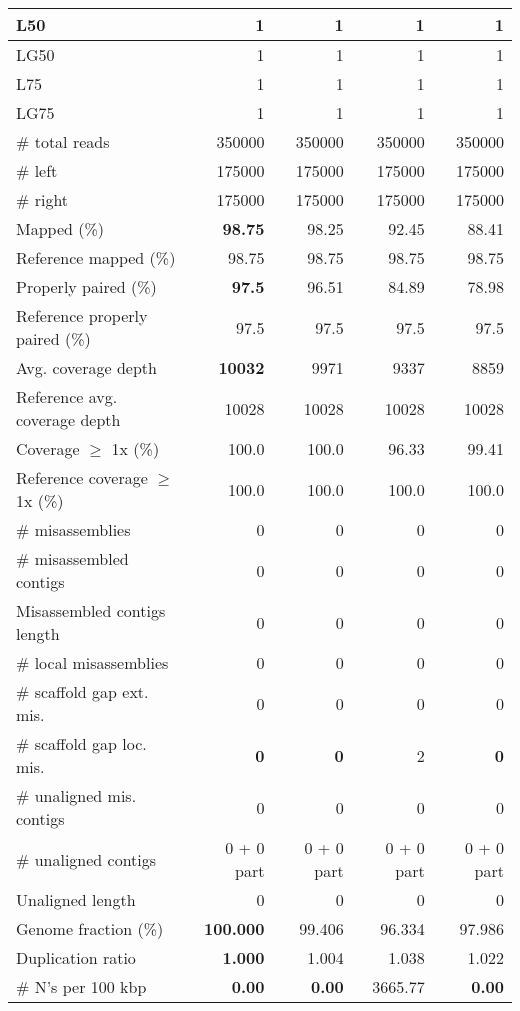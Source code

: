 \documentclass[12pt,a4paper]{article}
\begin{document}
\begin{table}[ht]
\begin{center}
\begin{tabular}{|l*{4}{|r}|}
L50 & 1 & 1 & 1 & 1 \\ \hline
LG50 & 1 & 1 & 1 & 1 \\ \hline
L75 & 1 & 1 & 1 & 1 \\ \hline
LG75 & 1 & 1 & 1 & 1 \\ \hline
\# total reads & 350000 & 350000 & 350000 & 350000 \\ \hline
\# left & 175000 & 175000 & 175000 & 175000 \\ \hline
\# right & 175000 & 175000 & 175000 & 175000 \\ \hline
Mapped (\%) & {\bf 98.75} & 98.25 & 92.45 & 88.41 \\ \hline
Reference mapped (\%) & 98.75 & 98.75 & 98.75 & 98.75 \\ \hline
Properly paired (\%) & {\bf 97.5} & 96.51 & 84.89 & 78.98 \\ \hline
Reference properly paired (\%) & 97.5 & 97.5 & 97.5 & 97.5 \\ \hline
Avg. coverage depth & {\bf 10032} & 9971 & 9337 & 8859 \\ \hline
Reference avg. coverage depth & 10028 & 10028 & 10028 & 10028 \\ \hline
Coverage $\geq$ 1x (\%) & 100.0 & 100.0 & 96.33 & 99.41 \\ \hline
Reference coverage $\geq$ 1x (\%) & 100.0 & 100.0 & 100.0 & 100.0 \\ \hline
\# misassemblies & 0 & 0 & 0 & 0 \\ \hline
\# misassembled contigs & 0 & 0 & 0 & 0 \\ \hline
Misassembled contigs length & 0 & 0 & 0 & 0 \\ \hline
\# local misassemblies & 0 & 0 & 0 & 0 \\ \hline
\# scaffold gap ext. mis. & 0 & 0 & 0 & 0 \\ \hline
\# scaffold gap loc. mis. & {\bf 0} & {\bf 0} & 2 & {\bf 0} \\ \hline
\# unaligned mis. contigs & 0 & 0 & 0 & 0 \\ \hline
\# unaligned contigs & 0 + 0 part & 0 + 0 part & 0 + 0 part & 0 + 0 part \\ \hline
Unaligned length & 0 & 0 & 0 & 0 \\ \hline
Genome fraction (\%) & {\bf 100.000} & 99.406 & 96.334 & 97.986 \\ \hline
Duplication ratio & {\bf 1.000} & 1.004 & 1.038 & 1.022 \\ \hline
\# N's per 100 kbp & {\bf 0.00} & {\bf 0.00} & 3665.77 & {\bf 0.00} \\ \hline

\end{tabular}
\end{center}
\end{table}
\end{document}
